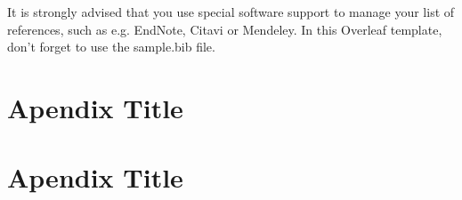 \documentclass{article}
\begin{document}
%

% 
% 
% 
% 
%
% 
% 
% 
%
% 


It is strongly advised that you use special software support to manage your list of references, such as e.g. EndNote, Citavi or Mendeley. In this Overleaf template, don't forget to use the sample.bib  file.

\newpage

\begin{appendices}

\section{Apendix Title}

\section{Apendix Title}

\end{appendices}
\end{document}
